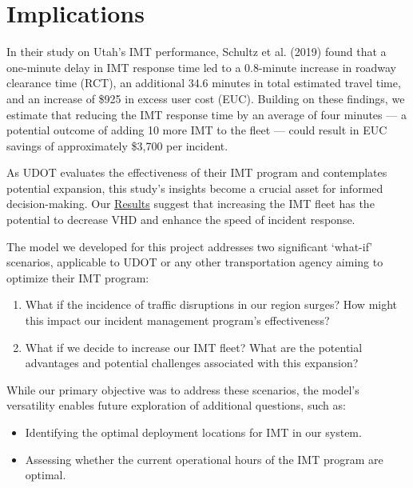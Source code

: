 \documentclass[fancy, oneside, mastersfancy, ms]{byuthesis}
\providecommand{\tightlist}{%
  \setlength{\itemsep}{0pt}\setlength{\parskip}{0pt}}\usepackage{longtable,booktabs,array}
\begin{document}
\hypertarget{sec-implications}{%
\section{Implications}\label{sec-implications}}

In their study on Utah's IMT performance, Schultz et al. (2019) found
that a one-minute delay in IMT response time led to a 0.8-minute
increase in roadway clearance time (RCT), an additional 34.6 minutes in
total estimated travel time, and an increase of \$925 in excess user
cost (EUC). Building on these findings, we estimate that reducing the
IMT response time by an average of four minutes --- a potential outcome
of adding 10 more IMT to the fleet --- could result in EUC savings of
approximately \$3,700 per incident.

As UDOT evaluates the effectiveness of their IMT program and
contemplates potential expansion, this study's insights become a crucial
asset for informed decision-making. Our
\protect\hyperlink{sec-results}{Results} suggest that increasing the IMT
fleet has the potential to decrease VHD and enhance the speed of
incident response.

The model we developed for this project addresses two significant
`what-if' scenarios, applicable to UDOT or any other transportation
agency aiming to optimize their IMT program:

\begin{enumerate}
\def\labelenumi{\arabic{enumi}.}
\tightlist
\item
  What if the incidence of traffic disruptions in our region surges? How
  might this impact our incident management program's effectiveness?
\item
  What if we decide to increase our IMT fleet? What are the potential
  advantages and potential challenges associated with this expansion?
\end{enumerate}

While our primary objective was to address these scenarios, the model's
versatility enables future exploration of additional questions, such as:

\begin{itemize}
\tightlist
\item
  Identifying the optimal deployment locations for IMT in our system.
\item
  Assessing whether the current operational hours of the IMT program are
  optimal.
\end{itemize}
\end{document}
